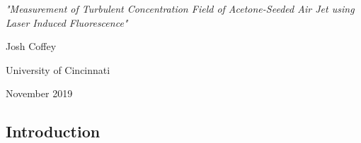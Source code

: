 \documentclass{article}
\begin{document}
\begin{titlepage}
    \vspace*{\fill}
    \begin{center}
        \LARGE \textit{"Measurement of Turbulent Concentration Field of Acetone-Seeded Air Jet using Laser Induced Fluorescence"}
    \end{center}
    \begin{center}
       \large Josh Coffey
    \end{center}
    \begin{center}
        \large University of Cincinnati
    \end{center}
    \begin{center}
        \large November 2019
    \end{center}
        \vspace*{\fill}
\end{titlepage}

\begin{center}
    \section*{Introduction}
\end{center}
\end{document}
